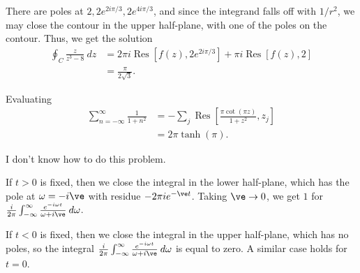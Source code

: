 \documentclass[10pt]{mypackage}
\DeclareMathOperator{\res}{Res}
\begin{document}
\RaggedRight
\begin{solution}[21.20a]
  There are poles at $2,2e^{2i\pi/3},2e^{4i\pi/3}$, and since the integrand falls off with $1/r^2$, we may close the contour in the upper half-plane, with one of the poles on the contour. Thus, we get the solution
  \begin{align*}
    \oint_{C} \frac{z}{z^3 - 8}\:dz &= 2\pi i \res\left[ f(z),2e^{2i\pi/3} \right] + \pi i \res\left[ f(z),2 \right]\\
                                    &= \frac{\pi}{2\sqrt{3}}.
  \end{align*}
\end{solution}
\begin{solution}[21.25a]
  Evaluating
  \begin{align*}
    \sum_{n=-\infty}^{\infty}\frac{1}{1 + n^2} &= -\sum_{j} \res\left[ \frac{\pi\cot\left( \pi z \right)}{1 + z^2}, z_j \right]\\
                                               &= 2\pi\tanh\left(\pi\right).
  \end{align*}
\end{solution}
\begin{solution}[21.26]
  I don't know how to do this problem.
\end{solution}
\begin{solution}[21.28]
  If $t > 0$ is fixed, then we close the integral in the lower half-plane, which has the pole at $\omega = -i\ve$ with residue $-2\pi i e^{-\ve t}$. Taking $\ve \rightarrow 0$, we get $1$ for $\frac{i}{2\pi}\int_{-\infty}^{\infty} \frac{e^{-i\omega t}}{\omega + i\ve}\:d\omega$.\newline

  If $t < 0$ is fixed, then we close the integral in the upper half-plane, which has no poles, so the integral $\frac{i}{2\pi}\int_{-\infty}^{\infty} \frac{e^{-i\omega t}}{\omega + i\ve}\:d\omega$ is equal to zero. A similar case holds for $t = 0$.
\end{solution}
\end{document}
